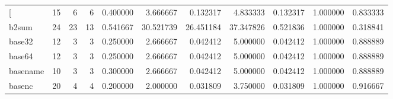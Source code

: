 \begin{longtable}{lrrrrrrrrrr}
\bottomrule
\endlastfoot
{[}         &                                      15 &                  6 &                                 6 &                                   0.400000 &                               3.666667 &                                     0.132317 &                          4.833333 &                                0.132317 &                           1.000000 &                                           0.833333 \\
b2sum     &                                      24 &                 23 &                                13 &                                   0.541667 &                              30.521739 &                                    26.451184 &                         37.347826 &                                0.521836 &                           1.000000 &                                           0.318841 \\
base32    &                                      12 &                  3 &                                 3 &                                   0.250000 &                               2.666667 &                                     0.042412 &                          5.000000 &                                0.042412 &                           1.000000 &                                           0.888889 \\
base64    &                                      12 &                  3 &                                 3 &                                   0.250000 &                               2.666667 &                                     0.042412 &                          5.000000 &                                0.042412 &                           1.000000 &                                           0.888889 \\
basename  &                                      10 &                  3 &                                 3 &                                   0.300000 &                               2.666667 &                                     0.042412 &                          5.000000 &                                0.042412 &                           1.000000 &                                           0.888889 \\
basenc    &                                      20 &                  4 &                                 4 &                                   0.200000 &                               2.000000 &                                     0.031809 &                          3.750000 &                                0.031809 &                           1.000000 &                                           0.916667 \\

\end{longtable}

